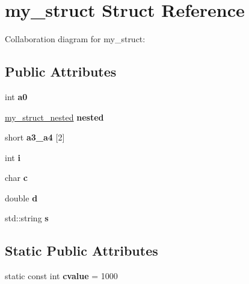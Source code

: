 \hypertarget{structmy__struct}{}\section{my\+\_\+struct Struct Reference}
\label{structmy__struct}


Collaboration diagram for my\+\_\+struct\+:
\subsection*{Public Attributes}
\begin{DoxyCompactItemize}
\item 
\mbox{\label{structmy__struct_ae87909278f2031116d2b1ca9d0a81f72}} 
int {\bfseries a0}
\item 
\mbox{\label{structmy__struct_a75b1a09fa1022eb4431b968dd3d7e0dd}} 
\mbox{\hyperlink{structmy__struct__nested}{my\+\_\+struct\+\_\+nested}} {\bfseries nested}
\item 
\mbox{\label{structmy__struct_a068caaf23039cccf35c0c8a020dfca52}} 
short {\bfseries a3\+\_\+a4} \mbox{[}2\mbox{]}
\item 
\mbox{\label{structmy__struct_aa03de09dde165f8416c2d35616bc3a78}} 
int {\bfseries i}
\item 
\mbox{\label{structmy__struct_aeb71f9558ca42d9ad68d46dc5b8e092c}} 
char {\bfseries c}
\item 
\mbox{\label{structmy__struct_a9b3ab091a7b297e644c6a4302bc57cf2}} 
double {\bfseries d}
\item 
\mbox{\label{structmy__struct_a10f0aa67b3478bdf74d56fd6669cebb3}} 
std\+::string {\bfseries s}
\end{DoxyCompactItemize}
\subsection*{Static Public Attributes}
\begin{DoxyCompactItemize}
\item 
\mbox{\label{structmy__struct_af3cca0ab21418eff825bd94153cf0f0a}} 
static const int {\bfseries cvalue} = 1000
\end{DoxyCompactItemize}


